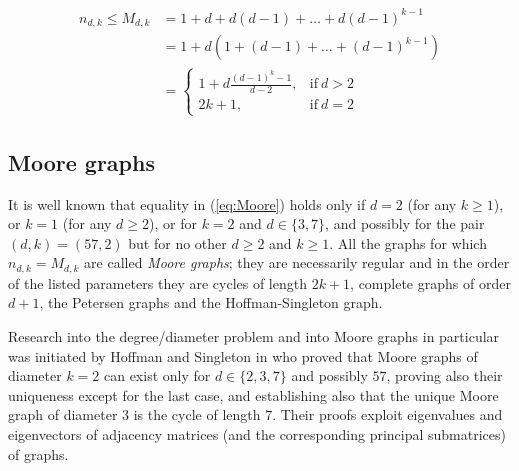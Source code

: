 \documentclass[a4paper,12pt,oneside]{report}%
\begin{document}
\begin{equation}\label{eq:Moore}
	\begin{split}
		n_{d,k} \leq M_{d,k}	& = 1 + d + d(d - 1) + \dots + d(d - 1)^{k-1}  \\
				 				& = 1 + d(1 + (d - 1) + \dots + (d - 1)^{k-1}) \\
				 				& =	\begin{cases}
										1+d\frac{(d-1)^{k}-1}{d-2}, & \text{if}\ d > 2 \\
										2k+1, & \text{if}\ d=2
									\end{cases}
	\end{split}
\end{equation}

\subsection{Moore graphs}
It is well known that equality in (\ref{eq:Moore}) holds only if $d=2$ (for any $k\ge 1$), or $k=1$ (for any $d\ge 2$), or for $k=2$ and $d\in \{3,7\}$, and possibly for the pair $(d,k)=(57,2)$ but for no other $d\ge 2$ and $k\ge 1$. All the graphs for which $n_{d,k}=M_{d,k}$ are called {\em Moore graphs}; they are necessarily regular and in the order of the listed parameters they are cycles of length $2k+1$, complete graphs of order $d+1$, the Petersen graphs and the Hoffman-Singleton graph.
\medskip

Research into the degree/diameter problem and into Moore graphs in particular was initiated by Hoffman and Singleton in \cite{Hof-Sin} who proved that Moore graphs of diameter $k=2$ can exist only for $d\in \{2,3,7\}$ and possibly $57$, proving also their uniqueness except for the last case, and establishing also that the unique Moore graph of diameter $3$ is the cycle of length $7$. Their proofs exploit eigenvalues and eigenvectors of adjacency matrices (and the corresponding principal submatrices) of graphs.
\medskip
\end{document}
